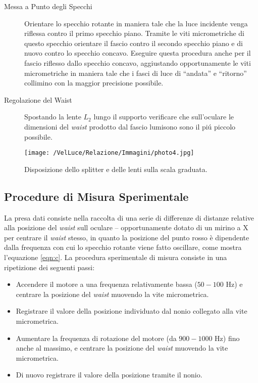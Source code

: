 \documentclass[a4paper,11pt]{article}
\newcommand{\virgolette}[1]{``#1''}
\begin{document}
\begin{description}
	\item[Messa a Punto degli Specchi] Orientare lo specchio rotante in maniera tale che la luce incidente venga riflessa contro il primo specchio piano. Tramite le viti micrometriche di questo specchio orientare il fascio contro il secondo specchio piano e di nuovo contro lo specchio concavo. Eseguire questa procedura anche per il fascio riflesso dallo specchio concavo, aggiustando opportunamente le viti micrometriche in maniera tale che i fasci di luce di \virgolette{andata} e \virgolette{ritorno} collimino con la maggior precisione possibile.
	\item[Regolazione del Waist] Spostando la lente $L_2$ lungo il supporto verificare che sull'oculare le dimensioni del \textit{waist} prodotto dal fascio lumisono sono il pi\'u piccolo possibile.
\end{description}

\begin{figure}[h]
		\centering
		\texttt{[image: /VelLuce/Relazione/Immagini/photo4.jpg]}    
		\caption{Disposizione dello splitter e delle lenti sulla scala graduata.}\label{photo4}
	\end{figure}
\subsection{Procedure di Misura Sperimentale}



La presa dati consiste nella raccolta di una serie di differenze di distanze relative alla posizione del \textit{waist} sull oculare  -- opportunamente dotato di un mirino a X per centrare il \textit{waist} stesso, in quanto la posizione del punto rosso è dipendente dalla frequenza con cui lo specchio rotante viene fatto oscillare, come mostra l'equazione \ref{eqn:c}. La procedura sperimentale di misura consiste in una ripetizione dei seguenti passi:

\begin{itemize}
	\item Accendere il motore a una frequenza relativamente bassa ($50-100$ Hz) e centrare la posizione del \textit{waist} muovendo la vite micrometrica.
	\item Registrare il valore della posizione individuato dal nonio collegato alla vite micrometrica.
	\item Aumentare la frequenza di rotazione del motore (da $900-1000$ Hz) fino anche al massimo, e centrare la posizione del \textit{waist} muovendo la vite micrometrica.
	\item Di nuovo registrare il valore della posizione tramite il nonio.
\end{itemize}
\end{document}

